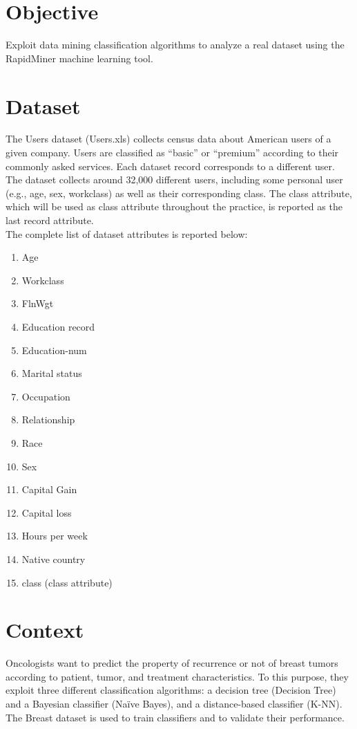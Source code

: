 \section{Objective}

Exploit data mining classification algorithms to analyze a real dataset using the RapidMiner machine
learning tool.

\section{Dataset}

The Users dataset (Users.xls) collects census data about American users of a given company. Users are
classified as “basic” or “premium” according to their commonly asked services. Each dataset record
corresponds to a different user. The dataset collects around 32,000 different users, including some
personal user (e.g., age, sex, workclass) as well as their corresponding class. The class attribute, which will
be used as class attribute throughout the practice, is reported as the last record attribute.
\\
The complete list of dataset attributes is reported below:
\begin{enumerate}
    \item Age
    \item Workclass
    \item FlnWgt
    \item Education record
    \item Education-num
    \item Marital status
    \item Occupation
    \item Relationship
    \item Race
    \item Sex
    \item Capital Gain
    \item Capital loss
    \item Hours per week
    \item Native country
    \item class (class attribute)
\end{enumerate}

\section{Context}

Oncologists want to predict the property of recurrence or not of breast tumors according to patient, tumor,
and treatment characteristics. To this purpose, they exploit three different classification algorithms: a
decision tree (Decision Tree) and a Bayesian classifier (Naïve Bayes), and a distance-based classifier (K-NN).
The Breast dataset is used to train classifiers and to validate their performance.